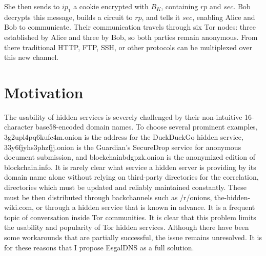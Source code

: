 She then sends to $ ip_{1} $ a cookie encrypted with $ B_{K} $, containing $ rp $ and $ sec $. Bob decrypts this message, builds a circuit to $ rp $, and tells it $ sec $, enabling Alice and Bob to communicate. Their communication travels through six Tor nodes: three established by Alice and three by Bob, so both parties remain anonymous. From there traditional HTTP, FTP, SSH, or other protocols can be multiplexed over this new channel.

\section{Motivation}

The usability of hidden services is severely challenged by their non-intuitive 16-character base58-encoded domain names. To choose several prominent examples, 3g2upl4pq6kufc4m.onion is the address for the DuckDuckGo hidden service, 33y6fjyhs3phzfjj.onion is the Guardian's SecureDrop service for anonymous document submission, and blockchainbdgpzk.onion is the anonymized edition of blockchain.info. It is rarely clear what service a hidden server is providing by its domain name alone without relying on third-party directories for the correlation, directories which must be updated and reliably maintained constantly. These must be then distributed through backchannels such as /r/onions, the-hidden-wiki.com, or through a hidden service that is known in advance. It is a frequent topic of conversation inside Tor communities. It is clear that this problem limits the usability and popularity of Tor hidden services. Although there have been some workarounds that are partially successful, the issue remains unresolved. It is for these reasons that I propose EsgalDNS as a full solution.
